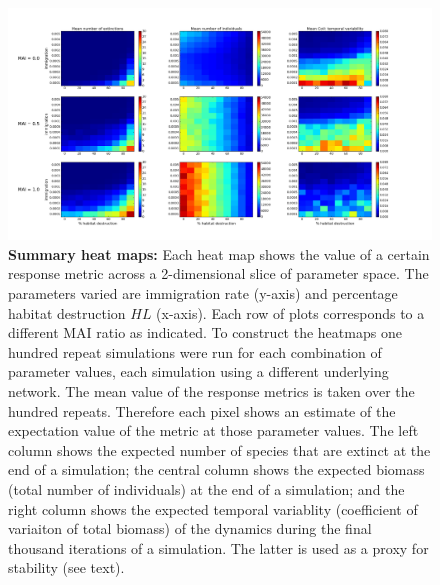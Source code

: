 \begin{itemize}
\begin{figure}
		\centering      
		\hspace{-3cm}

        \includegraphics[width=\linewidth]{"./chapters/chapter04/figures/sum_maps"}
        \caption{\textbf{Summary heat maps:} Each heat map shows the value of a certain response metric across a 2-dimensional slice of parameter space. The parameters varied are immigration rate (y-axis) and percentage habitat destruction $HL$ (x-axis). Each row of plots corresponds to a different MAI ratio as indicated. To construct the heatmaps one hundred repeat simulations were run for each combination of parameter values, each simulation using a different underlying network. The mean value of the response metrics is taken over the hundred repeats. Therefore each pixel shows an estimate of the expectation value of the metric at those parameter values. The left column shows the expected number of species that are extinct at the end of a simulation; the central column shows the expected biomass (total number of individuals) at the end of a simulation; and the right column shows the expected temporal variablity (coefficient of variaiton of total biomass) of the dynamics during the final thousand iterations of a simulation. The latter is used as a proxy for stability (see text).}\label{fig:summary_heatmaps_imvshl}
\end{figure}
\clearpage



\end{itemize}
